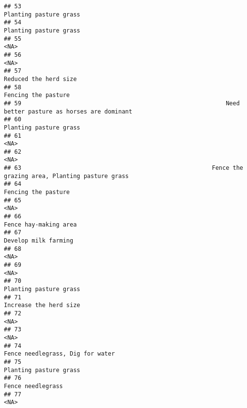 \documentclass[
]{article}
\begin{document}
\begin{verbatim}
## 53                                                                               Planting pasture grass
## 54                                                                               Planting pasture grass
## 55                                                                                                 <NA>
## 56                                                                                                 <NA>
## 57                                                                                Reduced the herd size
## 58                                                                                  Fencing the pasture
## 59                                                           Need better pasture as horses are dominant
## 60                                                                               Planting pasture grass
## 61                                                                                                 <NA>
## 62                                                                                                 <NA>
## 63                                                       Fence the grazing area, Planting pasture grass
## 64                                                                                  Fencing the pasture
## 65                                                                                                 <NA>
## 66                                                                                Fence hay-making area
## 67                                                                                 Develop milk farming
## 68                                                                                                 <NA>
## 69                                                                                                 <NA>
## 70                                                                               Planting pasture grass
## 71                                                                               Increase the herd size
## 72                                                                                                 <NA>
## 73                                                                                                 <NA>
## 74                                                                     Fence needlegrass, Dig for water
## 75                                                                               Planting pasture grass
## 76                                                                                    Fence needlegrass
## 77                                                                                                 <NA>

\end{verbatim}
\end{document}
